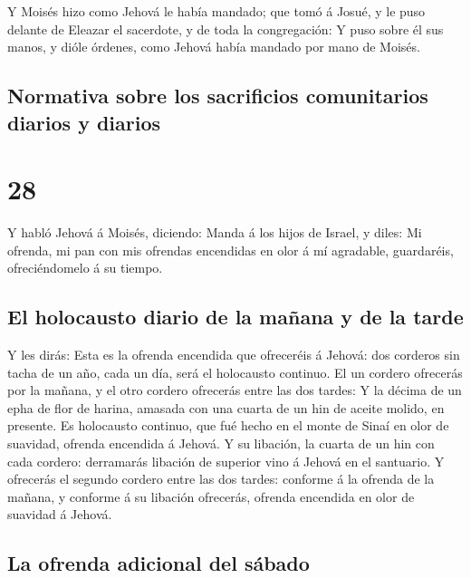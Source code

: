  Y Moisés hizo como Jehová le había mandado; que tomó á
Josué, y le puso delante de Eleazar el sacerdote, y de toda la
congregación:  Y puso sobre él sus manos, y dióle
órdenes, como Jehová había mandado por mano de Moisés.

\hypertarget{normativa-sobre-los-sacrificios-comunitarios-diarios-y-diarios}{%
\subsection{Normativa sobre los sacrificios comunitarios diarios y
diarios}\label{normativa-sobre-los-sacrificios-comunitarios-diarios-y-diarios}}

\hypertarget{section-04-28}{%
\section{28}\label{section-04-28}}

 Y habló Jehová á Moisés, diciendo:  Manda á
los hijos de Israel, y diles: Mi ofrenda, mi pan con mis ofrendas
encendidas en olor á mí agradable, guardaréis, ofreciéndomelo á su
tiempo.

\hypertarget{el-holocausto-diario-de-la-mauxf1ana-y-de-la-tarde}{%
\subsection{El holocausto diario de la mañana y de la
tarde}\label{el-holocausto-diario-de-la-mauxf1ana-y-de-la-tarde}}

 Y les dirás: Esta es la ofrenda encendida que ofreceréis
á Jehová: dos corderos sin tacha de un año, cada un día, será el
holocausto continuo.  El un cordero ofrecerás por la
mañana, y el otro cordero ofrecerás entre las dos tardes: 
Y la décima de un epha de flor de harina, amasada con una cuarta de un
hin de aceite molido, en presente.  Es holocausto
continuo, que fué hecho en el monte de Sinaí en olor de suavidad,
ofrenda encendida á Jehová.  Y su libación, la cuarta de
un hin con cada cordero: derramarás libación de superior vino á Jehová
en el santuario.  Y ofrecerás el segundo cordero entre las
dos tardes: conforme á la ofrenda de la mañana, y conforme á su libación
ofrecerás, ofrenda encendida en olor de suavidad á Jehová.

\hypertarget{la-ofrenda-adicional-del-suxe1bado}{%
\subsection{La ofrenda adicional del
sábado}\label{la-ofrenda-adicional-del-suxe1bado}}

